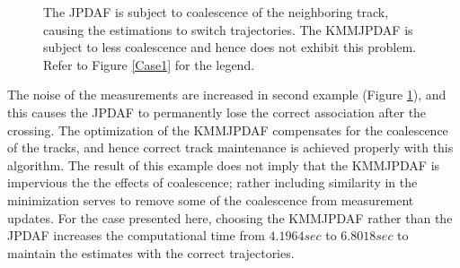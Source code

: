\documentclass[letterpaper, 10pt, conference]{ieeeconf}
\begin{document}
\begin{figure}
\centerline{
	}
\centerline{
	}
\caption{The JPDAF is subject to coalescence of the neighboring track, causing the estimations to switch trajectories. The KMMJPDAF is subject to less coalescence and hence does not exhibit this problem. Refer to Figure \ref{Case1} for the legend.}
\label{Case2}
\end{figure}

The noise of the measurements are increased in second example (Figure \ref{Case2}), and this causes the JPDAF to permanently lose the correct association after the crossing. The optimization of the KMMJPDAF compensates for the coalescence of the tracks, and hence correct track maintenance is achieved properly with this algorithm. The result of this example does not imply that the KMMJPDAF is impervious the the effects of coalescence; rather including similarity in the minimization serves to remove some of the coalescence from measurement updates. For the case presented here, choosing the KMMJPDAF rather than the JPDAF increases the computational time from $4.1964sec$ to $6.8018sec$ to maintain the estimates with the correct trajectories.
\end{document}
